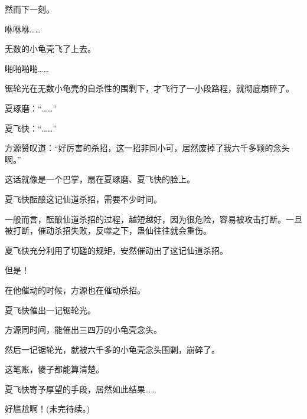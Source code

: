\begin{this_body}
然而下一刻。

咻咻咻……

无数的小龟壳飞了上去。

啪啪啪啪……

锯轮光在无数小龟壳的自杀性的围剿下，才飞行了一小段路程，就彻底崩碎了。

夏琢磨：“……”

夏飞快：“……”

方源赞叹道：“好厉害的杀招，这一招非同小可，居然废掉了我六千多颗的念头啊。”

这话就像是一个巴掌，扇在夏琢磨、夏飞快的脸上。

夏飞快酝酿这记仙道杀招，需要不少时间。

一般而言，酝酿仙道杀招的过程，越短越好，因为很危险，容易被攻击打断。一旦被打断，催动杀招失败，反噬之下，蛊仙往往就会重伤。

夏飞快充分利用了切磋的规矩，安然催动出了这记仙道杀招。

但是！

在他催动的时候，方源也在催动杀招。

夏飞快催出一记锯轮光。

方源同时间，能催出三四万的小龟壳念头。

然后一记锯轮光，就被六千多的小龟壳念头围剿，崩碎了。

这笔账，傻子都能算清楚。

夏飞快寄予厚望的手段，居然如此结果……

好尴尬啊！(未完待续。)

\end{this_body}

